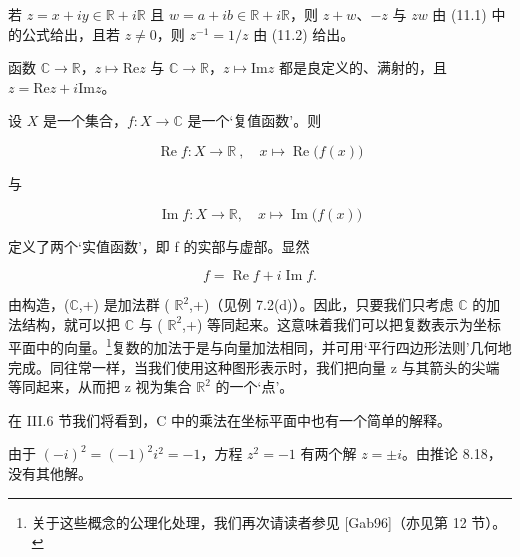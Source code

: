 \begin{remark}

\begin{items}
\item

若 $ z = x + iy \in \mathbb{R} + i\mathbb{R} $ 且 $ w = a + ib \in \mathbb{R} + i\mathbb{R} $，则 $ z + w $、$ -z $ 与 $ zw $ 由 (11.1) 中的公式给出，且若 $ z \neq 0 $，则 $ z^{-1} = 1/z $ 由 (11.2) 给出。

\item

函数 $\mathbb{C} \to \mathbb{R}$，$z \mapsto \mathrm{Re}z$ 与 $\mathbb{C} \to \mathbb{R}$，$z \mapsto \mathrm{Im}z$ 都是良定义的、满射的，且 $z = \mathrm{Re}z + i \mathrm{Im}z$。

\item

设 $X$ 是一个集合，$f: X \to \mathbb{C}$ 是一个‘复值函数’。则

\[
\operatorname{R e}f\colon X\to\mathbb{R}~,\quad x\mapsto\operatorname{R e}\bigl(f(x)\bigr)
\]

与

\[
\operatorname{Im}f\colon X\to\mathbb{R},\quad x\mapsto\operatorname{Im}\big(f(x)\big)
\]

定义了两个‘实值函数’，即 f 的实部与虚部。显然

\[
f=\operatorname{R e}f+i\operatorname{I m}f.
\]
\item

由构造，($ \mathbb{C} $,+) 是加法群 ( $ \mathbb{R}^2 $,+)（见例 7.2(d)）。因此，只要我们只考虑 $ \mathbb{C} $ 的加法结构，就可以把 $ \mathbb{C} $ 与 ( $ \mathbb{R}^2 $,+) 等同起来。这意味着我们可以把复数表示为坐标平面中的向量。\footnote{关于这些概念的公理化处理，我们再次请读者参见 [Gab96]（亦见第 12 节）。}复数的加法于是与向量加法相同，并可用‘平行四边形法则’几何地完成。同往常一样，当我们使用这种图形表示时，我们把向量 z 与其箭头的尖端等同起来，从而把 z 视为集合 $ \mathbb{R}^2 $ 的一个‘点’。

\end{items}


在 III.6 节我们将看到，C 中的乘法在坐标平面中也有一个简单的解释。

\begin{items}
\item[（e）]

由于 $ (-i)^{2}=(-1)^{2}i^{2}=-1 $，方程 $ z^{2}=-1 $ 有两个解 $ z=\pm i $。由推论 8.18，没有其他解。


\end{items}
\end{remark}

